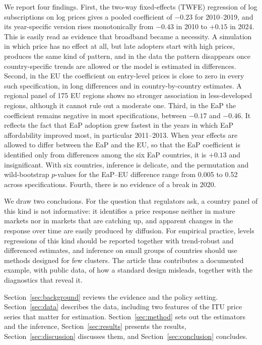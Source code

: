 \documentclass[pdflatex,sn-basic]{sn-jnl}
\begin{document}
We report four findings. First, the two-way fixed-effects (TWFE) regression of log subscriptions on log prices gives a pooled coefficient of $-0.23$ for 2010--2019, and its year-specific version rises monotonically from $-0.43$ in 2010 to $+0.15$ in 2024. This is easily read as evidence that broadband became a necessity. A simulation in which price has no effect at all, but late adopters start with high prices, produces the same kind of pattern, and in the data the pattern disappears once country-specific trends are allowed or the model is estimated in differences. Second, in the EU the coefficient on entry-level prices is close to zero in every such specification, in long differences and in country-by-country estimates. A regional panel of 175 EU regions shows no stronger association in less-developed regions, although it cannot rule out a moderate one. Third, in the EaP the coefficient remains negative in most specifications, between $-0.17$ and $-0.46$. It reflects the fact that EaP adoption grew fastest in the years in which EaP affordability improved most, in particular 2011--2013. When year effects are allowed to differ between the EaP and the EU, so that the EaP coefficient is identified only from differences among the six EaP countries, it is $+0.13$ and insignificant. With six countries, inference is delicate, and the permutation and wild-bootstrap $p$-values for the EaP--EU difference range from 0.005 to 0.52 across specifications. Fourth, there is no evidence of a break in 2020.

We draw two conclusions. For the question that regulators ask, a country panel of this kind is not informative: it identifies a price response neither in mature markets nor in markets that are catching up, and apparent changes in the response over time are easily produced by diffusion. For empirical practice, levels regressions of this kind should be reported together with trend-robust and differenced estimates, and inference on small groups of countries should use methods designed for few clusters. The article thus contributes a documented example, with public data, of how a standard design misleads, together with the diagnostics that reveal it.

Section~\ref{sec:background} reviews the evidence and the policy setting. Section~\ref{sec:data} describes the data, including two features of the ITU price series that matter for estimation. Section~\ref{sec:method} sets out the estimators and the inference, Section~\ref{sec:results} presents the results, Section~\ref{sec:discussion} discusses them, and Section~\ref{sec:conclusion} concludes.
\end{document}
